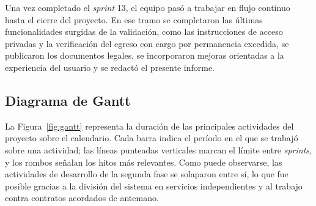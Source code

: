 Una vez completado el \textit{sprint} 13, el equipo pasó a trabajar en flujo continuo hasta el cierre del proyecto. En ese tramo se completaron las últimas funcionalidades surgidas de la validación, como las instrucciones de acceso privadas y la verificación del egreso con cargo por permanencia excedida, se publicaron los documentos legales, se incorporaron mejoras orientadas a la experiencia del usuario y se redactó el presente informe.

\subsection{Diagrama de Gantt}

La Figura~\ref{fig:gantt} representa la duración de las principales actividades del proyecto sobre el calendario. Cada barra indica el período en el que se trabajó sobre una actividad; las líneas punteadas verticales marcan el límite entre \textit{sprints}, y los rombos señalan los hitos más relevantes. Como puede observarse, las actividades de desarrollo de la segunda fase se solaparon entre sí, lo que fue posible gracias a la división del sistema en servicios independientes y al trabajo contra contratos acordados de antemano.


